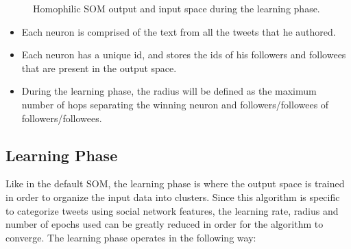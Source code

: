 \begin{figure}[htpb]
  \label{fig:homo_in_out}
  \caption{ Homophilic SOM output and input space during the learning phase. }
\end{figure}
\begin{itemize}
  \item Each neuron is comprised of the text from all the tweets that he authored.
  \item Each neuron has a unique id, and stores the ids of his followers and followees that are present in the output space.
  \item During the learning phase, the radius will be defined as the maximum number of hops separating the winning neuron and followers/followees of followers/followees. 
\end{itemize}


\subsection{Learning Phase}
\label{sub:learning_phase}
Like in the default \ac{SOM}, the learning phase is where the output space is trained in order to organize the input data into clusters. Since this algorithm is specific to categorize tweets using social network features, the learning rate, radius and number of epochs used can be greatly reduced in order for the algorithm to converge. The learning phase operates in the following way:

